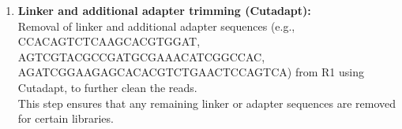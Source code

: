 \documentclass[
  11pt,
  a4paper,
]{report}
\newenvironment{Shaded}{\begin{snugshade}}{\end{snugshade}}
\newcommand{\AttributeTok}[1]{\textcolor[rgb]{0.40,0.45,0.13}{#1}}
\newcommand{\DataTypeTok}[1]{\textcolor[rgb]{0.68,0.00,0.00}{#1}}
\newcommand{\ExtensionTok}[1]{\textcolor[rgb]{0.00,0.23,0.31}{#1}}
\newcommand{\NormalTok}[1]{\textcolor[rgb]{0.00,0.23,0.31}{#1}}
\newcommand{\OperatorTok}[1]{\textcolor[rgb]{0.37,0.37,0.37}{#1}}
\newcommand{\StringTok}[1]{\textcolor[rgb]{0.13,0.47,0.30}{#1}}
\newcommand{\VariableTok}[1]{\textcolor[rgb]{0.07,0.07,0.07}{#1}}
\begin{document}
\begin{enumerate}
\begin{Shaded}
\end{Shaded}
\item
  \textbf{Linker and additional adapter trimming (Cutadapt):}\\
  Removal of linker and additional adapter sequences (e.g.,
  CCACAGTCTCAAGCACGTGGAT, AGTCGTACGCCGATGCGAAACATCGGCCAC,
  AGATCGGAAGAGCACACGTCTGAACTCCAGTCA) from R1 using Cutadapt, to further
  clean the reads.\\
  This step ensures that any remaining linker or adapter sequences are
  removed for certain libraries.


\end{enumerate}
\end{document}
